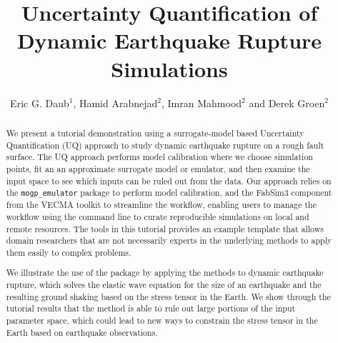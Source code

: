 \documentclass[openacc]{rstransa}%
\begin{document}
\title{Uncertainty Quantification of Dynamic Earthquake Rupture Simulations}

\author{%
Eric G. Daub$^{1}$, Hamid Arabnejad$^{2}$, Imran Mahmood$^{2}$ and Derek Groen$^{2}$}

\address{$^{1}$Research Engineering Group, Alan Turing Institute, London, UK\\
$^{2}$Department of Computer Science, Brunel University London, London, UK}

\subject{Uncertainty Quantification, Surrogate Modelling, Earthquake Mechanics}



\begin{abstract}

We present a tutorial demonstration using a surrogate-model based Uncertainty Quantification (UQ)
approach to study dynamic earthquake rupture on a rough fault surface. The UQ approach performs
model calibration where we choose simulation points, fit an an approximate surrogate
model or emulator, and then examine the input space to see which inputs can be ruled out from the data.
Our approach relies on the \texttt{mogp\_emulator} package to perform model calibration,
and the FabSim3 component from
the VECMA toolkit to streamline the workflow, enabling users to manage the workflow using the
command line to curate reproducible simulations on local and remote resources.
The tools in this tutorial provides an example template that allows domain researchers that are
not necessarily experts in the underlying
methods to apply them easily to complex problems.

We illustrate the use of the package by applying the methods to dynamic earthquake rupture, which solves
the elastic wave equation for the size of an earthquake and the resulting ground shaking based on the
stress tensor in the Earth. We show through the tutorial results that the method is able to rule out
large portions of the input parameter space, which could lead to new ways to constrain the stress tensor
in the Earth based on earthquake observations.

\end{abstract}
\end{document}
